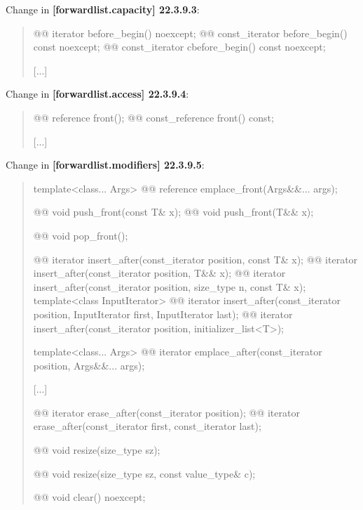 \documentclass{wg21}
\begin{document}
Change in \textbf{[forwardlist.capacity] 22.3.9.3}:
\begin{quote}
\begin{itemdecl}
@@ iterator before_begin() noexcept;
@@ const_iterator before_begin() const noexcept;
@@ const_iterator cbefore_begin() const noexcept;
\end{itemdecl}
[...]
\end{quote}

Change in \textbf{[forwardlist.access] 22.3.9.4}:
\begin{quote}
\begin{itemdecl}
@@ reference front();
@@ const_reference front() const;
\end{itemdecl}
[...]
\end{quote}

Change in \textbf{[forwardlist.modifiers] 22.3.9.5}:
\begin{quote}
\begin{itemdecl}
template<class... Args> @@ reference emplace_front(Args&&... args);    

@@ void push_front(const T& x);
@@ void push_front(T&& x);    

@@ void pop_front();
    
@@ iterator insert_after(const_iterator position, const T& x);
@@ iterator insert_after(const_iterator position, T&& x);
@@ iterator insert_after(const_iterator position, size_type n, const T& x);
template<class InputIterator>
  @@ iterator insert_after(const_iterator position, InputIterator first, InputIterator last);
@@ iterator insert_after(const_iterator position, initializer_list<T>);
        
template<class... Args> @@ iterator emplace_after(const_iterator position, Args&&... args);
\end{itemdecl}
[...]
\begin{itemdecl}
@@ iterator erase_after(const_iterator position);
@@ iterator erase_after(const_iterator first, const_iterator last);

@@ void resize(size_type sz);

@@ void resize(size_type sz, const value_type& c);
        
@@ void clear() noexcept;
\end{itemdecl}
\end{quote}
\end{document}
